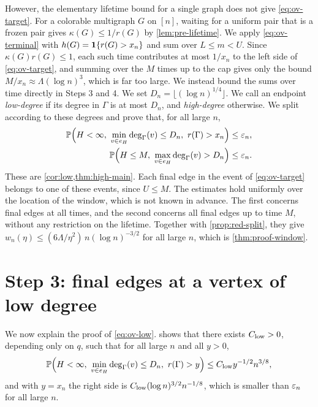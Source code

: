 However, the elementary lifetime bound for a single graph does not give \eqref{eq:ov-target}. For a colorable multigraph $G$ on $[n]$, waiting for a uniform pair that is a frozen pair gives $\kappa(G) \le 1/r(G)$ by \cref{lem:pre-lifetime}. We apply \eqref{eq:ov-terminal} with $h(G) = \mathbf 1\{r(G) > x_n\}$ and sum over $L \le m < U$. Since $\kappa(G)r(G) \le 1$, each such time contributes at most $1/x_n$ to the left side of \eqref{eq:ov-target}, and summing over the $M$ times up to the cap gives only the bound $M/x_n \approx \Lambda (\log n)^3$, which is far too large. We instead bound the sums over time directly in Steps 3 and 4. We set $D_n = \lfloor(\log n)^{1/4}\rfloor$. We call an endpoint \emph{low-degree} if its degree in $\Gamma$ is at most $D_n$, and \emph{high-degree} otherwise. We split according to these degrees and prove that, for all large $n$,
\begin{align}
\Pp\Bigl(H < \infty, \ \min_{v \in e_H} \deg_\Gamma(v) \le D_n, \ r(\Gamma) > x_n\Bigr) &\le \eps_n, \label{eq:ov-low} \\
\Pp\Bigl(H \le M, \ \max_{v \in e_H} \deg_\Gamma(v) > D_n\Bigr) &\le \eps_n. \label{eq:ov-high}
\end{align}
These are \cref{cor:low,thm:high-main}. Each final edge in the event of \eqref{eq:ov-target} belongs to one of these events, since $U \le M$. The estimates hold uniformly over the location of the window, which is not known in advance. The first concerns final edges at all times, and the second concerns all final edges up to time $M$, without any restriction on the lifetime. Together with \cref{prop:red-split}, they give $w_n(\eta) \le (6\Lambda/\eta^2) \, n (\log n)^{-3/2}$ for all large $n$, which is \cref{thm:proof-window}.

\section{Step 3: final edges at a vertex of low degree}\label{sec:ov-low}

We now explain the proof of \eqref{eq:ov-low}.  shows that there exists $C_{\rm low} > 0$, depending only on $q$, such that for all large $n$ and all $y > 0$,
\begin{equation}\label{eq:ov-low-main}
\Pp\Bigl(H < \infty, \ \min_{v \in e_H} \deg_\Gamma(v) \le D_n, \ r(\Gamma) > y\Bigr) \le C_{\rm low} y^{-1/2} n^{3/8},
\end{equation}
and with $y = x_n$ the right side is $C_{\rm low} (\log n)^{3/2} n^{-1/8}$, which is smaller than $\varepsilon_n$ for all large $n$.

